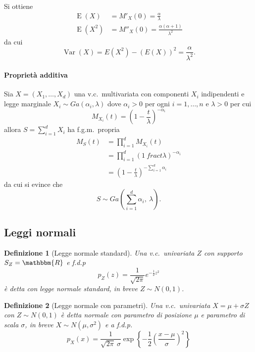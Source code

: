 \documentclass[11pt,a4paper,twoside]{article}
\newtheorem{definition}{Definizione}
\newcommand\R{\mathbbm{R}}
\newcommand\smallsum{\textstyle\sum}
\DeclareMathOperator{\Var}{Var}
\DeclareMathOperator{\E}{E}
\begin{document}
Si ottiene
\begin{align*}
  \E(X) &= M'_X(0) = \frac{\alpha}{\lambda} \\
  \E(X^2) &= M''_X(0) = \frac{\alpha (\alpha +1)}{\lambda^2}
\end{align*}
da cui
\[
  \Var(X) = E(X^2) - (E(X))^2 = \frac{\alpha}{\lambda^2}.
\]

\paragraph{Proprietà additiva}
Sia \(X = (X_1, \dots, X_d)\) una v.c.\ multivariata con componenti
\(X_i\) indipendenti e legge marginale \(X_i \sim Ga(\alpha_i,
\lambda)\) dove \(\alpha_i > 0\) per ogni \(i = 1, \dots, n\) e
\(\lambda > 0\) per cui
\[
  M_{X_i}(t) = \left( 1 - \frac{t}{\lambda} \right)^{-\alpha_i}
\]
allora \(S = \sum_{i=1}^d X_i\) ha f.g.m.\ propria
\begin{align*}
  M_S(t) &= \prod_{i=1}^d M_{X_i}(t) \\
         &= \prod_{i=1}^d \left( 1 \ frac{t}{\lambda} \right)^{-\alpha_i} \\
         &= \left( 1 - \frac{t}{\lambda} \right)^{- \sum_{i=1}^d \alpha_i}
\end{align*}
da cui si evince che
\[
  S \sim Ga\left( \smallsum_{i=1}^d \alpha_i, \: \lambda \right) .
\]

\subsection{Leggi normali}

\begin{definition}[Legge normale standard]
  Una v.c.\ univariata \(Z\) con supporto \(S_Z = \R\) e f.d.p
  \[
    p_Z(z) = \frac{1}{\sqrt{2 \pi}} e^{- \frac{1}{2} z^2}
  \]
  è detta con legge normale standard, in breve \(Z \sim N(0,
  1)\).
\end{definition}

\begin{definition}[Legge normale con parametri]
  Una v.c.\ univariata \(X = \mu + \sigma Z\) con \(Z \sim N(0, 1)\) è
  detta normale con parametro di posizione \(\mu\) e parametro di
  scala \(\sigma\), in breve \(X \sim N(\mu, \sigma^2)\) e a f.d.p.
  \[
    p_X(x) = \frac{1}{\sqrt{2 \pi}\: \sigma} \exp \left\{ -\frac{1}{2} \left( \frac{x - \mu}{\sigma} \right)^2 \right\}
  \]
\end{definition}
\end{document}
